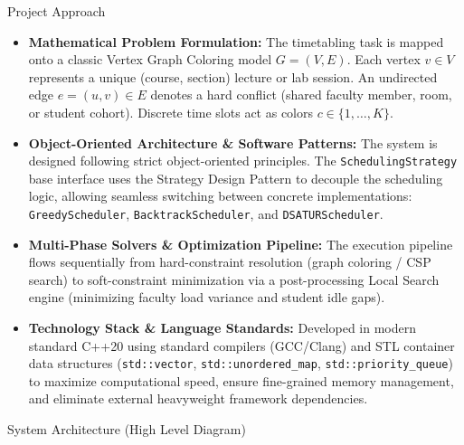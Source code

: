\documentclass[11pt,a4paper]{article}
\newcommand{\blueheading}[1]{%
    {\sffamily\color{TitleBlue}\fontsize{15}{18}\selectfont #1}%
}
\newcommand{\answerbox}[2][]{%
    \vspace{2pt}\par
    \noindent
    {\itshape #2}\par
    \vspace{2pt}
}
\begin{document}

\blueheading{Project Approach}

\vspace{1mm}


\answerbox{%
\begin{itemize}[leftmargin=*,noitemsep,topsep=2pt,itemsep=3pt]
    \item \textbf{Mathematical Problem Formulation:} The timetabling task is mapped onto a classic Vertex Graph Coloring model $G=(V,E)$. Each vertex $v \in V$ represents a unique (course, section) lecture or lab session. An undirected edge $e=(u,v) \in E$ denotes a hard conflict (shared faculty member, room, or student cohort). Discrete time slots act as colors $c \in \{1, \dots, K\}$.
    \item \textbf{Object-Oriented Architecture & Software Patterns:} The system is designed following strict object-oriented principles. The \texttt{SchedulingStrategy} base interface uses the Strategy Design Pattern to decouple the scheduling logic, allowing seamless switching between concrete implementations: \texttt{GreedyScheduler}, \texttt{BacktrackScheduler}, and \texttt{DSATURScheduler}.
    \item \textbf{Multi-Phase Solvers & Optimization Pipeline:} The execution pipeline flows sequentially from hard-constraint resolution (graph coloring / CSP search) to soft-constraint minimization via a post-processing Local Search engine (minimizing faculty load variance and student idle gaps).
    \item \textbf{Technology Stack & Language Standards:} Developed in modern standard C++20 using standard compilers (GCC/Clang) and STL container data structures (\texttt{std::vector}, \texttt{std::unordered\_map}, \texttt{std::priority\_queue}) to maximize computational speed, ensure fine-grained memory management, and eliminate external heavyweight framework dependencies.
\end{itemize}
}

\vspace{5mm}

\blueheading{System Architecture (High Level Diagram)}

\vspace{1mm}
\end{document}
